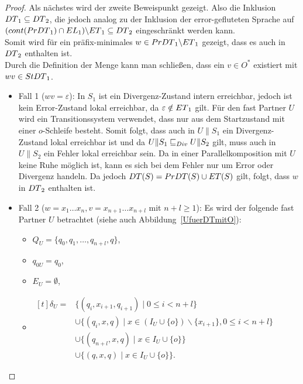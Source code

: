 \begin{proof}
  Als nächstes wird der zweite Beweispunkt gezeigt. Also die Inklusion
  $DT{}_1\subseteq DT{}_2$, die jedoch analog zu der Inklusion der
  error-gefluteten Sprache auf $(cont{}(PrDT{}_1)\cap
  EL{}_1)\backslash ET{}_1 \subseteq DT{}_2$ eingeschränkt werden kann.\\
  Somit wird für ein präfix-minimales $w\in PrDT{}_1\backslash ET{}_1$
  gezeigt, dass es auch in $DT{}_2$ enthalten ist.\\
  Durch die Definition der Menge \PrDT{} kann man schließen, dass ein $v\in
  O^*$ existiert mit $wv\in StDT{}_1$.
  \begin{itemize}
  \item Fall 1 ($wv=\varepsilon$): In $S_1$ ist ein Divergenz-Zustand intern
    erreichbar, jedoch ist kein Error-Zustand lokal erreichbar, da
    $\varepsilon\notin ET{}_1$ gilt. Für den fast Partner $U$ wird ein
    Transitionssystem verwendet, dass nur aus dem Startzustand mit einer
    $o$-Schleife besteht. Somit folgt, dass auch in $U\|S_1$ ein
    Divergenz-Zustand lokal erreichbar ist und da $U\|S_1\sqsubseteq _{Div} U\|S_2$ gilt,
    muss auch in $U\|S_2$ ein Fehler lokal erreichbar sein. Da in einer
    Parallelkomposition mit $U$ keine Ruhe möglich ist, kann es sich bei dem
    Fehler nur um Error oder Divergenz handeln. Da jedoch $DT(S) =
    PrDT{}(S)\cup ET{}(S)$ gilt, folgt, dass $w$ in $DT{}_2$ enthalten ist.
  \item Fall 2 ($w=x_1\dots x_n, v=x_{n+1}\dots x_{n+l}$ mit $n+l\geq 1$): Es
    wird der folgende fast Partner $U$ betrachtet (siehe auch
    Abbildung~\ref{UfuerDTmitO}):
      \begin{itemize}
        \item $Q_U=\{q_0,q_1,\dots ,q_{n+l}, q\}$,
        \item $q_{0U}=q_0$,
        \item $E_U=\emptyset$,
        \item $\begin{aligned}[t]
            \delta _U=&\{(q_i,x_{i+1},q_{i+1})\mid  0\leq i< n+l\}\\
                      &\cup\{(q_i,x,q)\mid  x\in (I_U\cup
          \{o\})\backslash\{x_{i+1}\}, 0\leq i< n+l\}\\
                      &\cup\{(q_{n+l},x,q)\mid x\in I_U\cup\{o\}\}\\
                      &\cup\{(q,x,q)\mid x\in I_U\cup\{o\}\}.
        \end{aligned}$
      \end{itemize}
      \begin{figure} [h!tbp]
      \begin{center}
\end{center}
\end{figure}
\end{itemize}
\end{proof}
